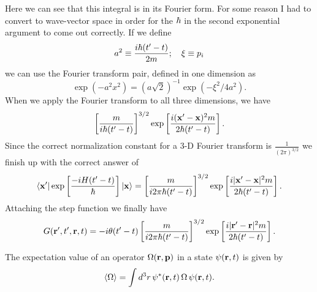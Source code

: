 \documentclass[11pt,letterpaper]{article}
\begin{document}
		Here we can see that this integral is in its Fourier form. For some reason I had to convert to wave-vector space in order for the $\hbar$
		in the second exponential argument to come out correctly. If we define 
		\[
			a^2 \equiv \frac{i\hbar(t'-t)}{2m};\quad \mathbf{\xi} \equiv p_i
		\]
		we can use the Fourier transform pair, defined in one dimension as
		\[
			\exp(-a^2x^2) = (a\sqrt 2)^{-1}\exp(-\xi^2/4a^2).
		\]
		When we apply the Fourier transform to all three dimensions, we have 
		\[
			\left[\frac{m}{i\hbar(t'-t)}\right]^{3/2}\exp\left[\frac{i(\mathbf{x}'-\mathbf{x})^2 m}{2\hbar(t'-t)}\right].
		\]
		Since the correct normalization constant for a 3-D Fourier transform is $\frac{1}{(2\pi)^{3/2}}$ we finish up with the correct answer of
		\[
			\braket{\mathbf{x}'|\exp\left[\frac{-iH(t'-t)}{\hbar}\right]|\mathbf{x}} = \left[\frac{m}{i2\pi\hbar(t'-t)}\right]^{3/2}\exp\left[\frac{i|\mathbf{x}'-\mathbf{x}|^2 m}{2\hbar(t'-t)}\right].
		\]
		Attaching the step function we finally have
		\[
			G(\mathbf{r}',t',\mathbf{r},t) = -i\theta(t'-t)\left[\frac{m}{i2\pi\hbar(t'-t)}\right]^{3/2}\exp\left[\frac{i|\mathbf{r}'-\mathbf{r}|^2 m}{2\hbar(t'-t)}\right].
		\]
	\eenum
		

	\item 
	The expectation value of an operator $\Omega(\mathbf{r},\mathbf{p})$ in a state $\psi(\mathbf{r},t)$ is given by 
	\[
		\braket{\Omega} = \int d^3r\, \psi^*(\mathbf{r},t)\,\Omega\,\psi(\mathbf{r},t).
	\]
		
\end{document}
